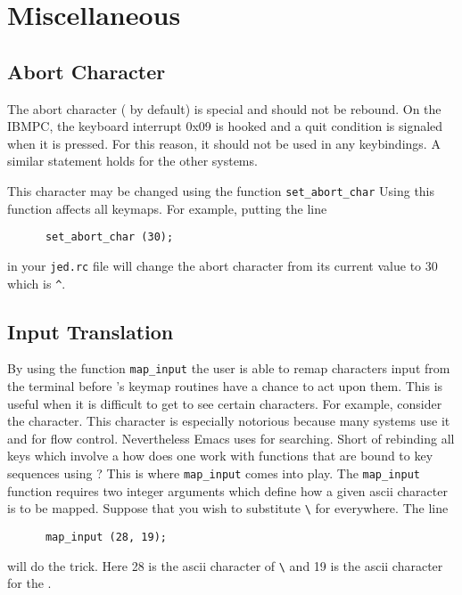 \section{Miscellaneous}

\subsection{Abort Character}
  The abort character ( by default) is special and should not be
  rebound.  On the IBMPC, the keyboard interrupt 0x09 is hooked and a quit
  condition is signaled when it is pressed.  For this reason, it should not
  be used in any keybindings. A similar statement holds for the other
  systems.

  This character may be changed using the function \verb|set_abort_char|
  Using this function affects all keymaps.  For example, putting the line
\begin{verbatim}
      set_abort_char (30);
\end{verbatim}
  in your \verb|jed.rc| file will change the abort character from its
  current value to 30 which is \verb|^|.

\subsection{Input Translation}

  By using the function \verb|map_input| the user is able to remap
  characters input from the terminal before \jed{}'s keymap routines have a
  chance to act upon them.  This is useful when it is difficult to get \jed{}
  to see certain characters.  For example, consider the 
  character.  This character is especially notorious because many systems
  use it and  for flow control. Nevertheless Emacs uses
   for searching.  Short of rebinding all keys which involve a
   how does one work with functions that are bound to key
  sequences using ?  This is where \verb|map_input| comes into
  play.  The \verb|map_input| function requires two integer arguments which
  define how a given ascii character is to be mapped.  Suppose that you wish
  to substitute \verb|\| for  everywhere. The line
\begin{verbatim}
      map_input (28, 19);
\end{verbatim}
  will do the trick.  Here 28 is the ascii character of \verb|\|
  and 19 is the ascii character for the .

